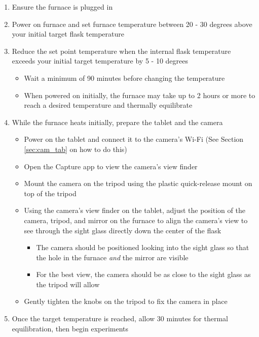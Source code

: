 \documentclass[letterpaper,11pt]{article}
\begin{document}
\begin{enumerate}
    \item Ensure the furnace is plugged in
    \item Power on furnace and set furnace temperature between 20 - 30 degrees 
        above your initial target flask temperature 
    \item Reduce the set point temperature when the internal flask temperature 
        exceeds your initial target temperature by 5 - 10 degrees 
        \begin{itemize}
        \item Wait a minimum of 90 minutes before changing the temperature
        \item When powered on initially, the furnace may take up to 2 hours or   
            more to reach a desired temperature and thermally equilibrate
        \end{itemize}
    
    \item While the furnace heats initially, prepare the tablet and the camera
        \begin{itemize}
        \item Power on the tablet and connect it to the camera's Wi-Fi (See 
            Section \ref{sec:cam_tab} on how to do this)
        \item Open the Capture app to view the camera's view finder
        \item Mount the camera on the tripod using the plastic quick-release
            mount on top of the tripod
        \item Using the camera's view finder on the tablet, adjust the
            position of the camera, tripod, and mirror on the furnace to 
            align the camera's view to see through the sight glass directly down
            the center of the flask
            \begin{itemize}
            \item The camera should be positioned looking into the sight glass
                so that the hole in the furnace \textit{and} the mirror 
                are visible 
            \item For the best view, the camera should be as close to the 
                sight glass as the tripod will allow
            \end{itemize}
        
        \item Gently tighten the knobs on the tripod to fix the camera in place
        \end{itemize}
    
    \item Once the target temperature is reached, allow 30 minutes for thermal 
        equilibration, then begin experiments
    \end{enumerate}
    
\end{document}
